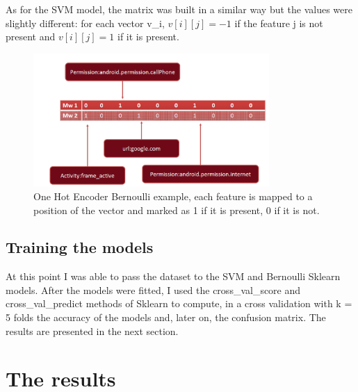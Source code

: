 \documentclass[12pt]{article}
\begin{document}
As for the SVM model, the matrix was built in a similar way but the values were slightly different: for each vector v\_i, $v[i][j] = -1$ if the feature j is not present and $v[i][j] = 1$ if it is present.

\begin{figure}[!ht]
	\centering %
	\includegraphics[width=0.8\textwidth]{hotencode.png} %
	\caption{One Hot Encoder Bernoulli example, each feature is mapped to a position of the vector and marked as 1 if it is present, 0 if it is not.} 
	\label{fig:1_hot_encode}
\end{figure}

\subsection{Training the models}
At this point I was able to pass the dataset to the SVM and Bernoulli Sklearn models. After the models were fitted, I used the cross\_val\_score and cross\_val\_predict methods of Sklearn to compute, in a cross validation with k = 5 folds the accuracy of the models and, later on, the confusion matrix. The results are presented in the next section.

\section{The results}
\end{document}
